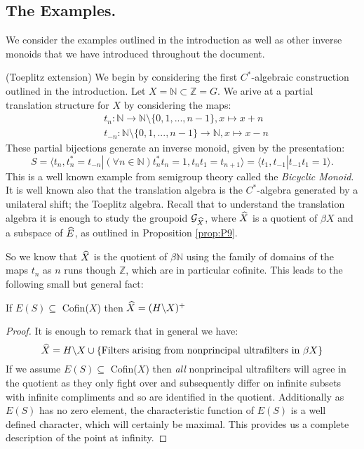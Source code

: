 \subsection{The Examples.}
We consider the examples outlined in the introduction as well as other inverse monoids that we have introduced throughout the document. 
\begin{example}\label{Ex:Toe}(Toeplitz extension)
We begin by considering the first $C^{*}$-algebraic construction outlined in the introduction. Let $X=\mathbb{N} \subset \mathbb{Z}=G$. We arive at a partial translation structure for $X$ by considering the maps:
\begin{eqnarray*}
& t_{n}: \mathbb{N} \rightarrow \mathbb{N}\setminus \lbrace 0,1,...,n-1 \rbrace, x \mapsto x+n \\
&t_{-n}: \mathbb{N}\setminus \lbrace 0,1,...,n-1 \rbrace \rightarrow \mathbb{N} , x \mapsto x-n
\end{eqnarray*} 
These partial bijections generate an inverse monoid, given by the presentation:
\begin{equation*}
S=\langle t_{n},t_{n}^{*}=t_{-n} | (\forall n \in \mathbb{N}) t_{n}^{*}t_{n}=1, t_{n}t_{1}=t_{n+1} \rangle = \langle t_{1},t_{-1} | t_{-1}t_{1}=1 \rangle.
\end{equation*}
This is a well known example from semigroup theory called the \textit{Bicyclic Monoid}. It is well known also that the translation algebra is the $C^{*}$-algebra generated by a unilateral shift; the Toeplitz algebra. Recall that to understand the translation algebra it is enough to study the groupoid $\mathcal{G}_{\widehat{X}}$, where $\widehat{X}$ is a quotient of $\beta X$ and a subspace of $\widehat{E}$, as outlined in Proposition \ref{prop:P9}.

So we know that $\widehat{X}$ is the quotient of $\beta \mathbb{N}$ using the family of domains of the maps $t_{n}$ as $n$ runs though $\mathbb{Z}$, which are in particular cofinite. This leads to the following small but general fact:

\begin{claim}\label{prop:example}
If $E(S) \subseteq $ Cofin($X$) then $\widehat{X} = (H \backslash X)^{+}$   
\end{claim}
\begin{proof}
It is enough to remark that in general we have:
\begin{equation*}
\widehat{X} = H\backslash X \cup \lbrace \mbox{Filters arising from nonprincipal ultrafilters in } \beta X \rbrace
\end{equation*} If we assume $E(S) \subseteq $ Cofin($X$) then \textit{all} nonprincipal ultrafilters will agree in the quotient as they only fight over and subsequently differ on infinite subsets with infinite compliments and so are identified in the quotient. Additionally as $E(S)$ has no zero element, the characteristic function of $E(S)$ is a well defined character, which will certainly be maximal. This provides us a complete description of the point at infinity.
\end{proof}


\end{example}
